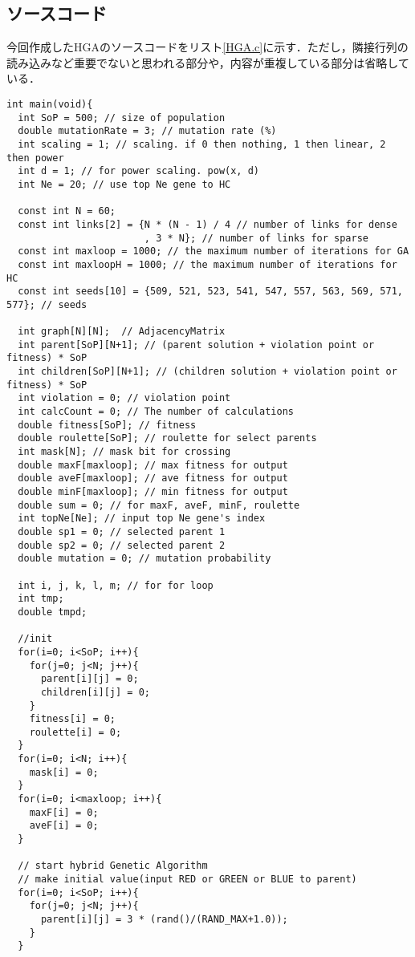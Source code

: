 \documentclass[a4j]{jarticle}
\begin{document}
\subsection{ソースコード}
今回作成したHGAのソースコードをリスト\ref{HGA.c}に示す．ただし，隣接行列の読み込みなど重要でないと思われる部分や，内容が重複している部分は省略している．
\begin{lstlisting}[caption=HGA.c, label=HGA.c, xleftmargin=1cm]
int main(void){  
  int SoP = 500; // size of population 
  double mutationRate = 3; // mutation rate (%)
  int scaling = 1; // scaling. if 0 then nothing, 1 then linear, 2 then power
  int d = 1; // for power scaling. pow(x, d)
  int Ne = 20; // use top Ne gene to HC

  const int N = 60;
  const int links[2] = {N * (N - 1) / 4 // number of links for dense
                        , 3 * N}; // number of links for sparse
  const int maxloop = 1000; // the maximum number of iterations for GA
  const int maxloopH = 1000; // the maximum number of iterations for HC
  const int seeds[10] = {509, 521, 523, 541, 547, 557, 563, 569, 571, 577}; // seeds

  int graph[N][N];  // AdjacencyMatrix
  int parent[SoP][N+1]; // (parent solution + violation point or fitness) * SoP
  int children[SoP][N+1]; // (children solution + violation point or fitness) * SoP
  int violation = 0; // violation point
  int calcCount = 0; // The number of calculations
  double fitness[SoP]; // fitness
  double roulette[SoP]; // roulette for select parents
  int mask[N]; // mask bit for crossing
  double maxF[maxloop]; // max fitness for output
  double aveF[maxloop]; // ave fitness for output
  double minF[maxloop]; // min fitness for output
  double sum = 0; // for maxF, aveF, minF, roulette
  int topNe[Ne]; // input top Ne gene's index
  double sp1 = 0; // selected parent 1
  double sp2 = 0; // selected parent 2
  double mutation = 0; // mutation probability

  int i, j, k, l, m; // for for loop
  int tmp;
  double tmpd;

  //init
  for(i=0; i<SoP; i++){
    for(j=0; j<N; j++){
      parent[i][j] = 0;
      children[i][j] = 0;
    }
    fitness[i] = 0;
    roulette[i] = 0;
  }
  for(i=0; i<N; i++){
    mask[i] = 0;
  }
  for(i=0; i<maxloop; i++){
    maxF[i] = 0;
    aveF[i] = 0;
  }
  
  // start hybrid Genetic Algorithm
  // make initial value(input RED or GREEN or BLUE to parent)
  for(i=0; i<SoP; i++){
    for(j=0; j<N; j++){
      parent[i][j] = 3 * (rand()/(RAND_MAX+1.0));
    }
  }


\end{lstlisting}
\end{document}

